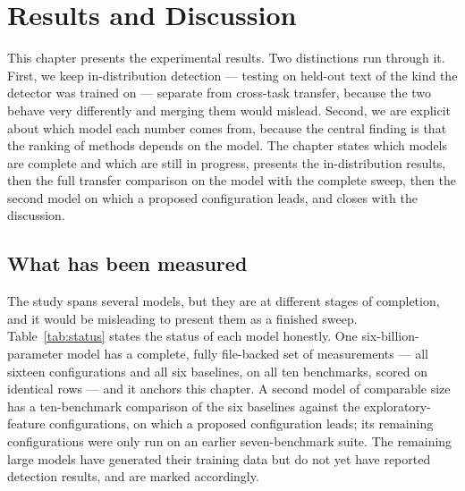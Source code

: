 \chapter{Results and Discussion}
\label{ch:results}

This chapter presents the experimental results. Two distinctions run through it. First, we
keep in-distribution detection --- testing on held-out text of the kind the detector was
trained on --- separate from cross-task transfer, because the two behave very differently and
merging them would mislead. Second, we are explicit about which model each number comes from,
because the central finding is that the ranking of methods depends on the model. The chapter
states which models are complete and which are still in progress, presents the in-distribution
results, then the full transfer comparison on the model with the complete sweep, then the
second model on which a proposed configuration leads, and closes with the discussion.

\section{What has been measured}

The study spans several models, but they are at different stages of completion, and it
would be misleading to present them as a finished sweep. Table~\ref{tab:status} states the
status of each model honestly. One six-billion-parameter model has a complete, fully
file-backed set of measurements --- all sixteen configurations and all six baselines, on all
ten benchmarks, scored on identical rows --- and it anchors this chapter. A second model of
comparable size has a ten-benchmark comparison of the six baselines against the
exploratory-feature configurations, on which a proposed configuration leads; its remaining
configurations were only run on an earlier seven-benchmark suite. The remaining large models
have generated their training data but do not yet have reported detection results, and are
marked accordingly.

